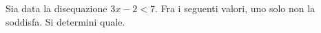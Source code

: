 Sia data la disequazione
$3x-2 < 7$. 
Fra i seguenti valori, uno solo non la soddisfa. Si determini quale.
